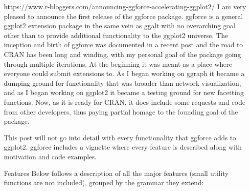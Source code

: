 https://www.r-bloggers.com/announcing-ggforce-accelerating-ggplot2/
I am very pleased to announce the first release of the ggforce package.
ggforce is a general ggplot2 extension package in the same vein as ggalt with no overarching goal
other than to provide additional functionality to the ggplot2 universe. The
inception and birth of ggforce was documented in a recent
post and the road to CRAN has
been long and winding, with my personal goal of the package going through
multiple iterations. At the beginning it was meant as a place where everyone
could submit extensions to. As I began working on
ggraph it became a dumping ground for
functionality that was broader than network visualization, and as I began
working on ggplot2 it became a testing ground for new facetting functions.
Now, as it is ready for CRAN, it does include some requests and code from other
developers, thus paying partial homage to the founding goal of the package.

This post will not go into detail with every functionality that ggforce adds to
ggplot2. ggforce includes a
vignette
where every feature is described along with motivation and code examples.

Features
Below follows a description of all the major features (small utility functions
are not included), grouped by the grammar they extend:

